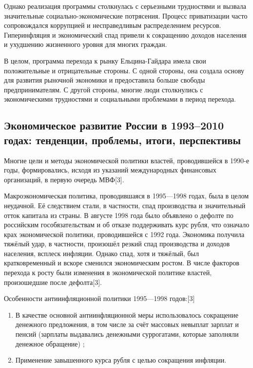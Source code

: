 \documentclass{article}
\begin{document}
Однако реализация программы столкнулась с серьезными трудностями и вызвала значительные социально-экономические потрясения. Процесс приватизации часто сопровождался коррупцией и несправедливым распределением ресурсов. Гиперинфляция и экономический спад привели к сокращению доходов населения и ухудшению жизненного уровня для многих граждан.

\hfill

В целом, программа перехода к рынку Ельцина-Гайдара имела свои положительные и отрицательные стороны. С одной стороны, она создала основу для развития рыночной экономики и предоставила больше свободы предпринимателям. С другой стороны, многие люди столкнулись с экономическими трудностями и социальными проблемами в период перехода.

\pagebreak
\subsection{Экономическое развитие России в 1993–2010 годах: тенденции, проблемы, итоги, перспективы}

Многие цели и методы экономической политики властей, проводившейся в 1990-е годы, формировались, исходя из указаний международных финансовых организаций, в первую очередь МВФ[3].

\hfill

Макроэкономическая политика, проводившаяся в 1995—1998 годах, была в целом неудачной. Её следствием стали, в частности, спад производства и значительный отток капитала из страны. В августе 1998 года было объявлено о дефолте по российским гособязательствам и об отказе поддерживать курс рубля, что означало крах экономической политики, проводившейся с 1992 года. Экономика получила тяжёлый удар, в частности, произошёл резкий спад производства и доходов населения, всплеск инфляции. Однако спад, хотя и тяжёлый, был кратковременный и вскоре сменился экономическим ростом. В числе факторов перехода к росту были изменения в экономической политике властей, произошедшие после дефолта[3].

\hfill

Особенности антиинфляционной политики 1995—1998 годов:[3]

\begin{enumerate}
    \item В качестве основной антиинфляционной меры использовалось сокращение денежного предложения, в том числе за счёт массовых невыплат зарплат и пенсий (зарплаты выдавались денежными суррогатами, которые заполняли денежное обращение) ;
    \item Применение завышенного курса рубля с целью сокращения инфляции.
\end{enumerate}
\end{document}
